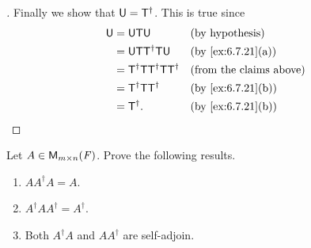 \begin{proof}[]
  Finally we show that \(\mathsf{U} = \mathsf{T}^{\dag}\).
  This is true since
  \begin{align*}
    \U & = \U \T \U                            &  & \text{(by hypothesis)}         \\
       & = \U \T \T^{\dag} \T \U               &  & \by{ex:6.7.21}[a]              \\
       & = \T^{\dag} \T \T^{\dag} \T \T^{\dag} &  & \text{(from the claims above)} \\
       & = \T^{\dag} \T \T^{\dag}              &  & \by{ex:6.7.21}[b]              \\
       & = \T^{\dag}.                          &  & \by{ex:6.7.21}[b]
  \end{align*}
\end{proof}

\begin{ex}\label{ex:6.7.23}
  Let \(A \in \ms\).
  Prove the following results.
  \begin{enumerate}
    \item \(A A^{\dag} A = A\).
    \item \(A^{\dag} A A^{\dag} = A^{\dag}\).
    \item Both \(A^{\dag} A\) and \(A A^{\dag}\) are self-adjoin.
  \end{enumerate}
\end{ex}

